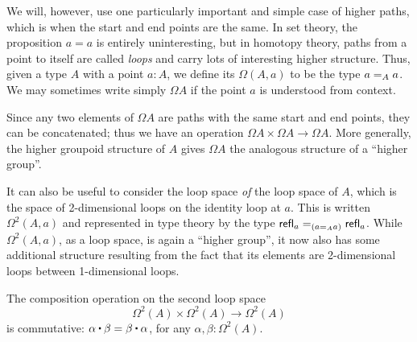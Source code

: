 We will, however, use one particularly important and simple case of higher paths, which is when the start and end points are the same.
In set theory, the proposition $a=a$ is entirely uninteresting, but in homotopy theory, paths from a point to itself are called \emph{loops} and carry lots of interesting higher structure.
Thus, given a type $A$ with a point $a:A$, we define its 
%
$\Omega(A,a)$ to be the type $\id[A]{a}{a}$.
We may sometimes write simply $\Omega A$ if the point $a$ is understood from context.

Since any two elements of $\Omega A$ are paths with the same start and end points, they can be concatenated;
thus we have an operation $\Omega A\times \Omega A\to \Omega A$.
More generally, the higher groupoid structure of $A$ gives $\Omega A$ the analogous structure of a ``higher group''.

It can also be useful to consider the loop space \emph{of} the loop space of $A$, which is the space of 2-dimensional loops on the identity loop at $a$.
This is written $\Omega^2(A,a)$ and represented in type theory by the type $\id[({\id[A]{a}{a}})]{\refl{a}}{\refl{a}}$.
While $\Omega^2(A,a)$, as a loop space, is again a ``higher group'', it now also has some additional structure resulting from the fact that its elements are 2-dimensional loops between 1-dimensional loops.  

\begin{thm}\label{thm:EckmannHilton}
  The composition operation on the second loop space
  \begin{equation*}
    \Omega^2(A)\times \Omega^2(A)\to \Omega^2(A)
  \end{equation*}
  is commutative: $\alpha\ct\beta = \beta\ct\alpha$, for any $\alpha, \beta:\Omega^2(A)$.
\end{thm}

